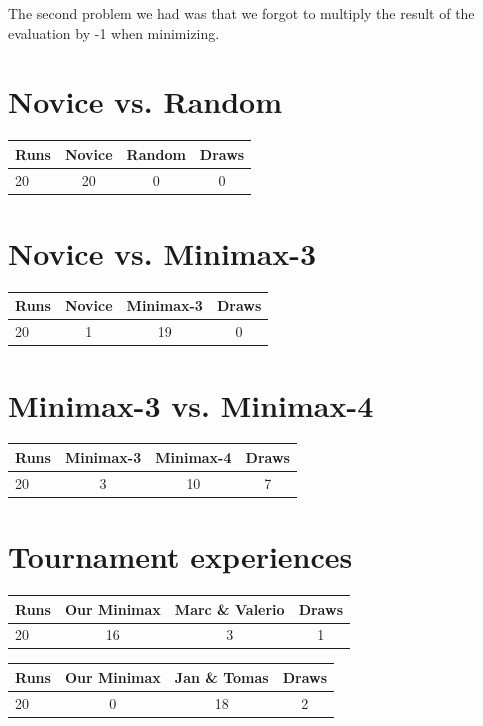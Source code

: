 \documentclass{scrartcl}
\begin{document}
The second problem we had was that we forgot to multiply the result of the evaluation by -1 when minimizing.

\section{Novice vs. Random}

\begin{tabular}{l c c c}
Runs & Novice & Random & Draws \\
\hline
20 & 20 & 0 & 0  \\
\end{tabular}

\section{Novice vs. Minimax-3}

\begin{tabular}{l c c c}
Runs & Novice & Minimax-3 & Draws \\
\hline
20 & 1 & 19 & 0  \\
\end{tabular}

\section{Minimax-3 vs. Minimax-4}

\begin{tabular}{l c c c}
Runs & Minimax-3 & Minimax-4 & Draws \\
\hline
20 & 3 & 10 & 7  \\
\end{tabular}

\section{Tournament experiences}

\begin{tabular}{l c c c}
Runs & Our Minimax & Marc \& Valerio & Draws \\
\hline
20 & 16 & 3 & 1  \\
\end{tabular}

\begin{tabular}{l c c c}
Runs & Our Minimax & Jan \& Tomas & Draws \\
\hline
20 & 0 & 18 & 2  \\
\end{tabular}
\end{document}
